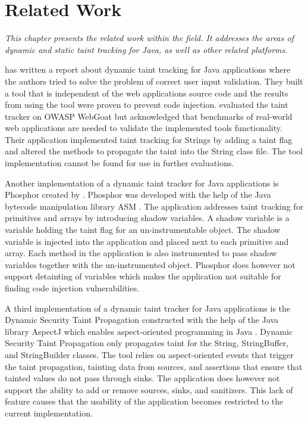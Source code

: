 \chapter{Related Work}
\label{RW}
\textit{This chapter presents the related work within the field. It addresses the areas of dynamic and static taint tracking for Java, as well as other related platforms.}

\textcite{Haldar} has written a report about dynamic taint tracking for Java applications where the authors tried to solve the problem of correct user input validation. They built a tool that is independent of the web applications source code and the results from using the tool were proven to prevent code injection. \textcite{Haldar} evaluated the taint tracker on OWASP WebGoat \parencite{webgoat} but acknowledged that benchmarks of real-world web applications are needed to validate the implemented tools functionality. Their application implemented taint tracking for Strings by adding a taint flag and altered the methods to propagate the taint into the String class file. The tool \textcite{Haldar} implementation cannot be found for use in further evaluations.

Another implementation of a dynamic taint tracker for Java applications is Phosphor \parencite{phosphor} created by \textcite{BellJ.2014PIdd}. Phosphor was developed with the help of the Java bytecode manipulation library ASM \parencite{asm}. The application addresses taint tracking for primitives and arrays by introducing shadow variables. A shadow variable is a variable holding the taint flag for an un-instrumentable object. The shadow variable is injected into the application and placed next to each primitive and array. Each method in the application is also instrumented to pass shadow variables together with the un-instrumented object. Phosphor does however not support detainting of variables \parencite{BellJ.2014PIdd} which makes the application not suitable for finding code injection vulnerabilities. 

A third implementation of a dynamic taint tracker for Java applications is the Dynamic Security Taint Propagation \parencite{securityTaint} constructed with the help of the Java library AspectJ which enables aspect-oriented programming in Java \parencite{aspectj}. Dynamic Security Taint Propagation only propagates taint for the String, StringBuffer, and StringBuilder classes. The tool relies on aspect-oriented events that trigger the taint propagation, tainting data from sources, and assertions that ensure that tainted values do not pass through sinks. The application does however not support the ability to add or remove sources, sinks, and sanitizers. This lack of feature causes that the usability of the application becomes restricted to the current implementation.

